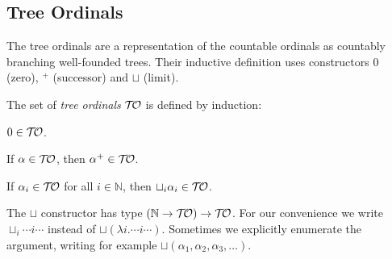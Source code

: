\subsection{Tree Ordinals}\label{sub:tree}



%

%

The tree ordinals \citep{dennis-jones-wainer-84} are a representation
of the countable ordinals as countably branching well-founded
trees. Their inductive definition uses constructors $0$ (zero), $^+$
(successor) and $\sqcup$ (limit).

\begin{definition}\label{def:ordinals}%
The set of \emph{tree ordinals} $\mathcal{T\!O}$ is defined by induction:
\begin{compactenum}
  \item
    $0 \in \mathcal{T\!O}$.
  \item
    If $\alpha \in \mathcal{T\!O}$, then $\alpha^+ \in \mathcal{T\!O}$.
  \item
    If $\alpha_i \in \mathcal{T\!O}$ for all $i \in \mathbb{N}$, then $\sqcup_i
    \alpha_i \in \mathcal{T\!O}$.
\end{compactenum}
\end{definition}
The $\sqcup$ constructor has type $(\mathbb{N} \rightarrow \mathcal{T\!O}) \rightarrow
\mathcal{T\!O}$. For our convenience we write $\sqcup_i \cdots i \cdots$ instead
of $\sqcup (\lambda i . \cdots i \cdots)$. Sometimes we explicitly enumerate
the argument, writing for example $\sqcup ( \alpha_1, \alpha_2,
\alpha_3, \ldots )$.

